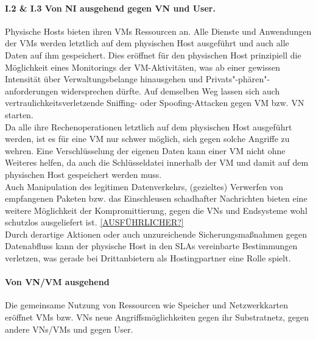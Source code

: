 \paragraph{I.2 \& I.3 Von NI ausgehend gegen VN und User.}
\label{parag:vonNI}
Physische Hosts bieten ihren VMs Ressourcen an. Alle Dienste und Anwendungen der VMs werden letztlich auf dem physischen Host ausgeführt und auch alle Daten auf ihm gespeichert. Dies eröffnet für den physischen Host prinzipiell die Möglichkeit eines Monitorings der VM-Aktivitäten, was ab einer gewissen Intensität über Verwaltungsbelange hinausgehen und Privats"-phären"-anforderungen widersprechen dürfte. Auf demselben Weg lassen sich auch vertraulichkeitsverletzende Sniffing- oder Spoofing-Attacken gegen VM bzw. VN starten. \\
Da alle ihre Rechenoperationen letztlich auf dem physischen Host ausgeführt werden, ist es für eine VM nur schwer möglich, sich gegen solche Angriffe zu wehren. Eine Verschlüsselung der eigenen Daten kann einer VM nicht ohne Weiteres helfen, da auch die Schlüsseldatei innerhalb der VM und damit auf dem physischen Host gespeichert werden muss.\\
Auch Manipulation des legitimen Datenverkehrs, (gezieltes) Verwerfen von empfangenen Paketen bzw. das Einschleusen schadhafter Nachrichten bieten eine weitere Möglichkeit der Kompromittierung, gegen die VNs und Endsysteme wohl schutzlos ausgeliefert ist.
\underline{[AUSFÜHRLICHER?]}\\
Durch derartige Aktionen oder auch unzureichende Sicherungsmaßnahmen gegen Datenabfluss kann der physische Host in den SLAs vereinbarte Bestimmungen verletzen, was gerade bei Drittanbietern als Hostingpartner eine Rolle spielt.



\paragraph{Von VN/VM ausgehend}
\label{parag:vonVN}
Die gemeinsame Nutzung von Ressourcen wie Speicher und Netzwerkkarten eröffnet VMs bzw. VNs neue Angriffsmöglichkeiten gegen ihr Substratnetz, gegen andere VNs/VMs und gegen User.


